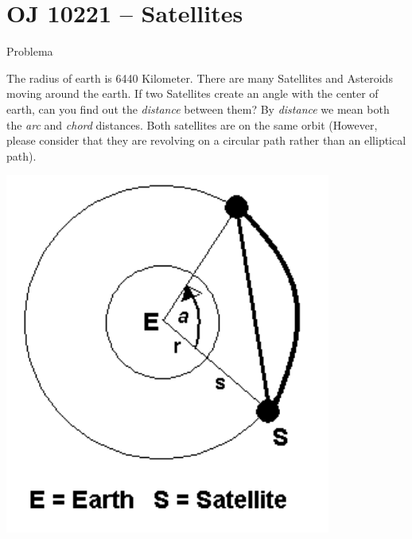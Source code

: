 \section{OJ 10221 -- Satellites}

\begin{frame}[fragile]{Problema}

\begin{minipage}{0.45\textwidth}
The radius of earth is 6440 Kilometer. There are many Satellites
and Asteroids moving around the earth. If two Satellites create
an angle with the center of earth, can you find out the \textit{distance}
between them? By \textit{distance} we mean both the \textit{arc} and \textit{chord}
distances. Both satellites are on the same orbit (However, please
consider that they are revolving on a circular path rather than
an elliptical path).
\end{minipage}
\begin{minipage}{0.5\textwidth}
\begin{center}
\includegraphics[scale=0.75]{figure.png}
\end{center}
\end{minipage}

\end{frame}

